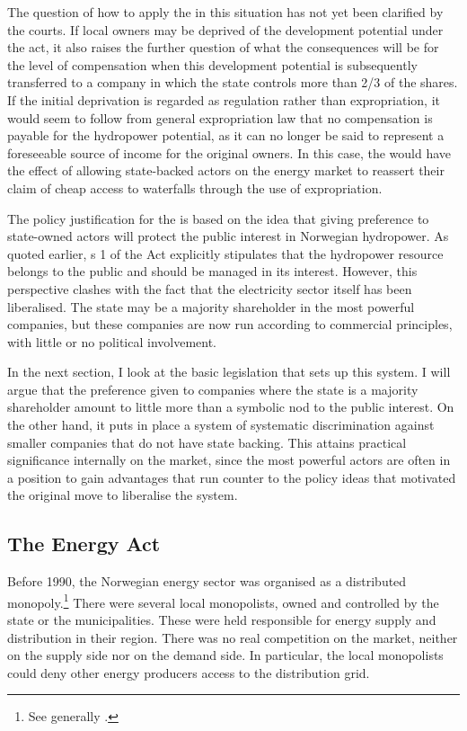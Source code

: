 The question of how to apply the \cite{ica17} in this situation has not yet been clarified by the courts. If local owners may be deprived of the development potential under the act, it also raises the further question of what the consequences will be for the level of compensation when this development potential is subsequently transferred to a company in which the state controls more than 2/3 of the shares. If the initial deprivation is regarded as regulation rather than expropriation, it would seem to follow from general expropriation law that no compensation is payable for the hydropower potential, as it can no longer be said to represent a foreseeable source of income for the original owners. In this case, the \cite{ica17} would have the effect of allowing state-backed actors on the energy market to reassert their claim of cheap access to waterfalls through the use of expropriation.

The policy justification for the \cite{ica17} is based on the idea that giving preference to state-owned actors will protect the public interest in Norwegian hydropower. As quoted earlier, s 1 of the Act explicitly stipulates that the hydropower resource belongs to the public and should be managed in its interest. However, this perspective clashes with the fact that the electricity sector itself has been liberalised. The state may be a majority shareholder in the most powerful companies, but these companies are now run according to commercial principles, with little or no political involvement.

In the next section, I look at the basic legislation that sets up this system. I will argue that the preference given to companies where the state is a majority shareholder amount to little more than a symbolic nod to the public interest. On the other hand, it puts in place a system of systematic discrimination against smaller companies that do not have state backing. This attains practical significance internally on the market, since the most powerful actors are often in a position to gain advantages that run counter to the policy ideas that motivated the original move to liberalise the system.

\subsection{The Energy Act}\label{sec:ea}

Before 1990, the Norwegian energy sector was organised as a distributed monopoly.\footnote{See generally \cite{bye05,skjold07}.} There were several local monopolists, owned and controlled by the state or the municipalities. These were held responsible for energy supply and distribution in their region. There was no real competition on the market, neither on the supply side nor on the demand side. In particular, the local monopolists could deny other energy producers access to the distribution grid.

